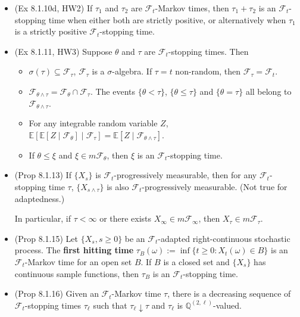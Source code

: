 \documentclass[twoside]{article}
\newcommand\bbE{\mathbb{E}}
\newcommand\bbQ{\mathbb{Q}}
\newcommand\calF{\mathcal{F}}
\newcommand\om{\omega}
\newcommand\sg{\sigma}
\def\t{\theta}
\begin{document}
\begin{itemize}
\item (Ex 8.1.10d, HW2) If $\tau_1$ and $\tau_2$ are $\calF_t$-Markov times, then $\tau_1 + \tau_2$ is an $\calF_t$-stopping time when either both are strictly positive, or alternatively when $\tau_1$ is a strictly positive $\calF_t$-stopping time.

\item (Ex 8.1.11, HW3) Suppose $\t$ and $\tau$ are $\calF_t$-stopping times. Then
\begin{itemize}
\item $\sg(\tau) \subseteq \calF_\tau$, $\calF_\tau$ is a $\sg$-algebra. If $\tau = t$ non-random, then $\calF_\tau = \calF_t$.

\item $\calF_{\t \wedge \tau} = \calF_\t \cap \calF_\tau$. The events $\{\t < \tau\}$, $\{\t \leq \tau\}$ and $\{\t = \tau \}$ all belong to $\calF_{\t \wedge \tau}$.

\item For any integrable random variable $Z$, $\bbE [\bbE[Z \mid \calF_\t] \mid \calF_\tau] = \bbE[Z \mid \calF_{\t \wedge \tau}]$.

\item If $\t \leq \xi$ and $\xi \in m\calF_\t$, then $\xi$ is an $\calF_t$-stopping time.
\end{itemize}

\item (Prop 8.1.13) If $\{X_s\}$ is $\calF_t$-progressively measurable, then for any $\calF_t$-stopping time $\tau$, $\{X_{s \wedge \tau}\}$ is also $\calF_t$-progressively measurable. (Not true for adaptedness.)

In particular, if $\tau < \infty$ or there exists $X_\infty \in m\calF_\infty$, then $X_\tau \in m\calF_\tau$.

\item (Prop 8.1.15) Let $\{ X_s, s \geq 0\}$ be an $\calF_t$-adapted right-continuous stochastic process. The \textbf{first hitting time} $\tau_B(\om) := \inf \{ t \geq 0: X_t(\om) \in B\}$ is an $\calF_t$-Markov time for an open set $B$. If $B$ is a closed set and $\{X_s\}$ has continuous sample functions, then $\tau_B$ is an $\calF_t$-stopping time.

\item (Prop 8.1.16) Given an $\calF_t$-Markov time $\tau$, there is a decreasing sequence of $\calF_t$-stopping times $\tau_\ell$ such that $\tau_\ell \downarrow \tau$ and $\tau_\ell$ is $\bbQ^{(2, \ell)}$-valued.
\end{itemize}
\end{document}
